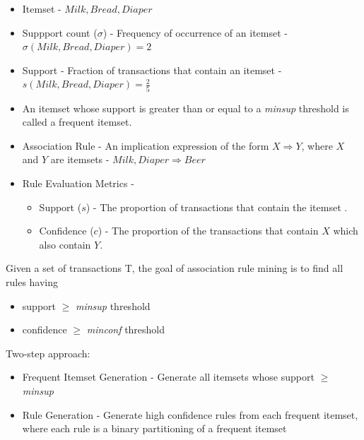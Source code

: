 \begin{itemize}
   \item Itemset - ${Milk,Bread,Diaper}$
   \item Suppport count ($\sigma$) - Frequency of occurrence of an itemset - $\sigma({Milk,Bread,Diaper}) = 2$
   \item Support - Fraction of transactions that contain an itemset - $s({Milk,Bread,Diaper})=\frac{2}{5}$
   \item An itemset whose support is greater than or equal to a \textit{minsup} threshold is called a frequent itemset.
   \item Association Rule - An implication expression of the form $X \Rightarrow Y$, where $X$ and $Y$ are itemsets - ${Milk,Diaper} \Rightarrow {Beer}$
   \item Rule Evaluation Metrics - 
   \begin{itemize}
      \item Support ($s$) - The proportion of transactions that contain the itemset .
      \item Confidence ($c$) - The proportion of the transactions that contain $X$ which also contain $Y$.
   \end{itemize}
\end{itemize}

Given a set of transactions T, the goal of association rule mining is to find all rules having
\begin{itemize}
	\item support $\geq$ \textit{minsup} threshold
	\item confidence $\geq$ \textit{minconf} threshold
\end{itemize}

Two-step approach:
\begin{itemize}
	\item Frequent Itemset Generation - Generate all itemsets whose support $\geq$ \textit{minsup}
	\item Rule Generation - Generate high confidence rules from each frequent itemset, where each rule is a binary partitioning of a frequent itemset
\end{itemize}

